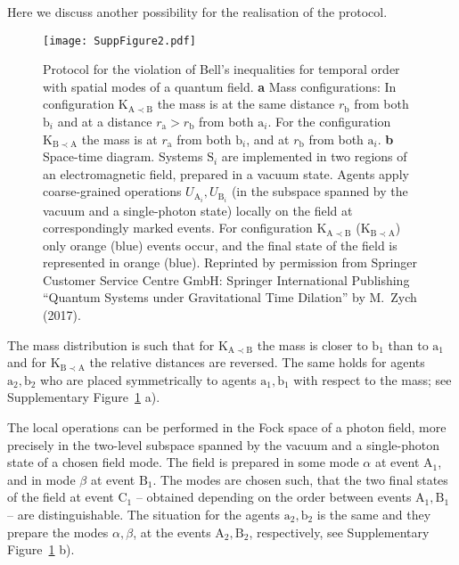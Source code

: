 \documentclass[a4paper,11pt]{article}
\begin{document}
%
Here we discuss another possibility for the realisation of the protocol.%
\begin{figure}[h!]
\begin{center}
\texttt{[image: SuppFigure2.pdf]}
\caption{Protocol for the violation of Bell's inequalities for temporal order with spatial modes of a quantum field. \textbf{a} Mass configurations: In configuration $\mathrm{K_{A\prec B}}$ the mass is at the same distance $r_\mathrm{b}$ from both $\mathrm b_i$ and at a distance $r_\mathrm{a}>r_\mathrm{b}$ from both $\mathrm a_i$. For the configuration $\mathrm{K_{B\prec A}}$ the mass is at $r_\mathrm{a}$ from both $\mathrm b_i$, and at $r_\mathrm{b}$ from both $\mathrm a_i$. \textbf{b} Space-time diagram. Systems $\mathrm S_i$ are implemented in two regions of an electromagnetic field, prepared in a  vacuum state. Agents apply coarse-grained operations $U_{\mathrm A_i}, U_{\mathrm B_i}$ (in the subspace spanned by the vacuum and a single-photon state) locally on the field at correspondingly marked events. For configuration $\mathrm{K_{A\prec B}}$ ($\mathrm{K_{B\prec A}}$) only orange (blue) events occur, and the final state of the field is represented in orange (blue). Reprinted by permission from Springer Customer Service Centre GmbH: Springer International Publishing ``Quantum Systems under Gravitational Time Dilation'' by M.~Zych (2017).\hspace*{\fill}}
\label{realisation_supp}
\end{center}
\end{figure}
The mass distribution is such that for $\mathrm{K_{A\prec B}}$ the mass is closer to $\mathrm b_1$ than to $\mathrm a_1$ and for $\mathrm{K_{B\prec A}}$ the relative distances are reversed. The same holds for agents $\mathrm{a_2, b_2}$ who are placed symmetrically to agents $\mathrm{a_1, b_1}$ with respect to the mass; see Supplementary Figure~\ref{realisation_supp} a).

The local operations can be performed in the Fock space of a  photon field, more precisely in the two-level subspace spanned by the vacuum and a single-photon state of a chosen field mode. The field is prepared in some mode $\alpha$ at event $\mathrm A_1$, and in mode $\beta$  at  event $\mathrm B_1$. The modes are chosen such,  that the two final states of the field at event $\mathrm C_1$ -- obtained depending on the order between events $\mathrm{A_1, B_1}$  -- are distinguishable. The situation for the agents $\mathrm{a_2, b_2}$ is the same and they prepare the modes $\alpha, \beta$, at the events  $\mathrm{A_2, B_2}$, respectively, see Supplementary Figure~\ref{realisation_supp} b).
\end{document}
